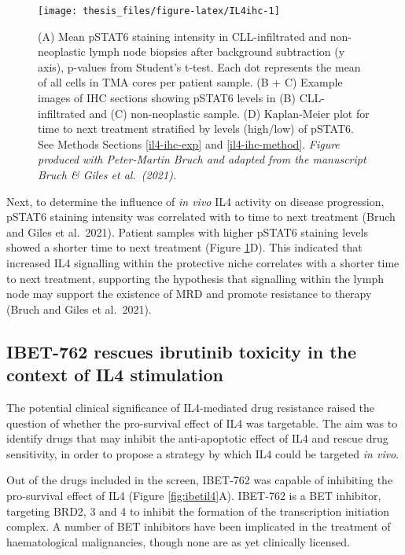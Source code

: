 \documentclass[11pt, a4paper, twosided]{book}
\begin{document}
\begin{figure}

{\centering \texttt{[image: thesis\_files/figure-latex/IL4ihc-1]} 

}

\caption{(A) Mean pSTAT6 staining intensity in CLL-infiltrated and non-neoplastic lymph node biopsies after background subtraction (y axis), p-values from Student's t-test. Each dot represents the mean of all cells in TMA cores per patient sample. (B + C) Example images of IHC sections showing pSTAT6 levels in (B) CLL-infiltrated and (C) non-neoplastic sample. (D) Kaplan-Meier plot for time to next treatment stratified by levels (high/low) of pSTAT6. See Methods Sections \ref{il4-ihc-exp} and \ref{il4-ihc-method}. \emph{Figure produced with Peter-Martin Bruch and adapted from the manuscript Bruch \& Giles et al.~(2021).}}\label{fig:IL4ihc}
\end{figure}
Next, to determine the influence of \emph{in vivo} IL4 activity on disease progression, pSTAT6 staining intensity was correlated with to time to next treatment (Bruch and Giles et al.~2021). Patient samples with higher pSTAT6 staining levels showed a shorter time to next treatment (Figure \ref{fig:IL4ihc}D). This indicated that increased IL4 signalling within the protective niche correlates with a shorter time to next treatment, supporting the hypothesis that signalling within the lymph node may support the existence of MRD and promote resistance to therapy (Bruch and Giles et al.~2021).

\hypertarget{ibet-762-rescues-ibrutinib-toxicity-in-the-context-of-il4-stimulation}{%
\subsection{IBET-762 rescues ibrutinib toxicity in the context of IL4 stimulation}\label{ibet-762-rescues-ibrutinib-toxicity-in-the-context-of-il4-stimulation}}

The potential clinical significance of IL4-mediated drug resistance raised the question of whether the pro-survival effect of IL4 was targetable. The aim was to identify drugs that may inhibit the anti-apoptotic effect of IL4 and rescue drug sensitivity, in order to propose a strategy by which IL4 could be targeted \emph{in vivo}.

Out of the drugs included in the screen, IBET-762 was capable of inhibiting the pro-survival effect of IL4 (Figure \ref{fig:ibetil4}A). IBET-762 is a BET inhibitor, targeting BRD2, 3 and 4 to inhibit the formation of the transcription initiation complex. A number of BET inhibitors have been implicated in the treatment of haematological malignancies, though none are as yet clinically licensed.
\end{document}
